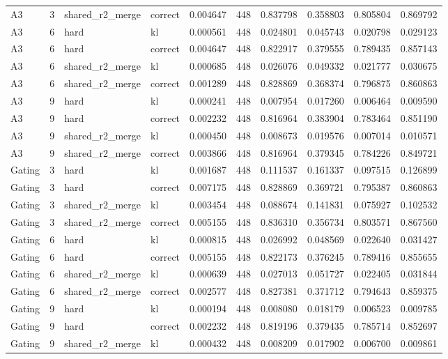 \begin{tabular}{lrllrrrrrr}
A3 & 3 & shared_r2_merge & correct & 0.004647 & 448 & 0.837798 & 0.358803 & 0.805804 & 0.869792 \\
A3 & 6 & hard & kl & 0.000561 & 448 & 0.024801 & 0.045743 & 0.020798 & 0.029123 \\
A3 & 6 & hard & correct & 0.004647 & 448 & 0.822917 & 0.379555 & 0.789435 & 0.857143 \\
A3 & 6 & shared_r2_merge & kl & 0.000685 & 448 & 0.026076 & 0.049332 & 0.021777 & 0.030675 \\
A3 & 6 & shared_r2_merge & correct & 0.001289 & 448 & 0.828869 & 0.368374 & 0.796875 & 0.860863 \\
A3 & 9 & hard & kl & 0.000241 & 448 & 0.007954 & 0.017260 & 0.006464 & 0.009590 \\
A3 & 9 & hard & correct & 0.002232 & 448 & 0.816964 & 0.383904 & 0.783464 & 0.851190 \\
A3 & 9 & shared_r2_merge & kl & 0.000450 & 448 & 0.008673 & 0.019576 & 0.007014 & 0.010571 \\
A3 & 9 & shared_r2_merge & correct & 0.003866 & 448 & 0.816964 & 0.379345 & 0.784226 & 0.849721 \\
Gating & 3 & hard & kl & 0.001687 & 448 & 0.111537 & 0.161337 & 0.097515 & 0.126899 \\
Gating & 3 & hard & correct & 0.007175 & 448 & 0.828869 & 0.369721 & 0.795387 & 0.860863 \\
Gating & 3 & shared_r2_merge & kl & 0.003454 & 448 & 0.088674 & 0.141831 & 0.075927 & 0.102532 \\
Gating & 3 & shared_r2_merge & correct & 0.005155 & 448 & 0.836310 & 0.356734 & 0.803571 & 0.867560 \\
Gating & 6 & hard & kl & 0.000815 & 448 & 0.026992 & 0.048569 & 0.022640 & 0.031427 \\
Gating & 6 & hard & correct & 0.005155 & 448 & 0.822173 & 0.376245 & 0.789416 & 0.855655 \\
Gating & 6 & shared_r2_merge & kl & 0.000639 & 448 & 0.027013 & 0.051727 & 0.022405 & 0.031844 \\
Gating & 6 & shared_r2_merge & correct & 0.002577 & 448 & 0.827381 & 0.371712 & 0.794643 & 0.859375 \\
Gating & 9 & hard & kl & 0.000194 & 448 & 0.008080 & 0.018179 & 0.006523 & 0.009785 \\
Gating & 9 & hard & correct & 0.002232 & 448 & 0.819196 & 0.379435 & 0.785714 & 0.852697 \\
Gating & 9 & shared_r2_merge & kl & 0.000432 & 448 & 0.008209 & 0.017902 & 0.006700 & 0.009861 \\

\end{tabular}
